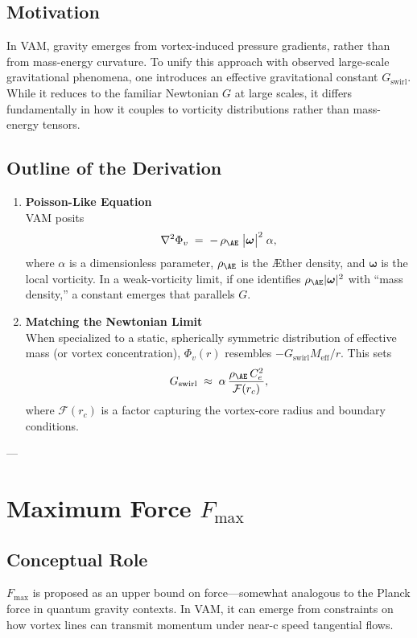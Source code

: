 \subsection{Motivation}
In VAM, gravity emerges from vortex-induced pressure gradients, rather than from mass-energy curvature. To unify this approach with observed large-scale gravitational phenomena, one introduces an effective gravitational constant \(G_{\text{swirl}}\). While it reduces to the familiar Newtonian \(G\) at large scales, it differs fundamentally in how it couples to vorticity distributions rather than mass-energy tensors.

\subsection{Outline of the Derivation}
\begin{enumerate}
    \item \textbf{Poisson-Like Equation} \\
    VAM posits
    \[
        \nabla^2 \Phi_v
        \;=\;
        -\,\rho_{\mathrm{\AE}}\;\bigl|\boldsymbol{\omega}\bigr|^2 \; \alpha,
    \]
    where \(\alpha\) is a dimensionless parameter, \(\rho_{\mathrm{\AE}}\) is the Æther density, and \(\boldsymbol{\omega}\) is the local vorticity. In a weak-vorticity limit, if one identifies \(\rho_{\mathrm{\AE}} |\boldsymbol{\omega}|^2\) with “mass density,” a constant emerges that parallels \(G\).

    \item \textbf{Matching the Newtonian Limit} \\
    When specialized to a static, spherically symmetric distribution of effective mass (or vortex concentration), \(\Phi_v(r)\) resembles \(-G_{\text{swirl}} M_{\text{eff}}/r\). This sets
    \[
        G_{\text{swirl}}
        \;\approx\;
        \alpha \,\frac{\rho_{\mathrm{\AE}}\,C_e^2}{\mathcal{F}(r_c)},
    \]
    where \(\mathcal{F}(r_c)\) is a factor capturing the vortex-core radius and boundary conditions.
\end{enumerate}

---

\section{Maximum Force \(F_{\text{max}}\)}

\subsection{Conceptual Role}
\(F_{\text{max}}\) is proposed as an upper bound on force—somewhat analogous to the Planck force in quantum gravity contexts. In VAM, it can emerge from constraints on how vortex lines can transmit momentum under near-c speed tangential flows.

